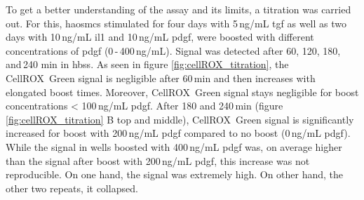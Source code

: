     To get a better understanding of the assay and its limits, a titration was carried out. For this, \acp{haosmc} stimulated for four days with 5\,ng/mL \ac{tgf} as well as two days with 10\,ng/mL \ac{il1} and 10\,ng/mL  \ac{pdgf}, were boosted with different concentrations of \ac{pdgf} (0\,-\,400\,ng/mL). Signal was detected after 60, 120, 180, and\,240 min in \ac{hbss}. As seen in figure \ref{fig:cellROX_titration}, the CellROX\texttrademark~Green signal is negligible after 60\,min and then increases with elongated boost times. Moreover, CellROX\texttrademark~Green signal stays negligible for boost concentrations < 100\,ng/mL \ac{pdgf}. After 180 and 240\,min (figure \ref{fig:cellROX_titration} B top and middle), CellROX\texttrademark~Green signal is significantly increased for boost with 200\,ng/mL \ac{pdgf} compared to no boost (0\,ng/mL \ac{pdgf}). While the signal in wells boosted with 400\,ng/mL \ac{pdgf} was, on average higher than the signal after boost with 200\,ng/mL \ac{pdgf}, this increase was not reproducible. On one hand, the signal was extremely high. On other hand, the other two repeats, it collapsed.

